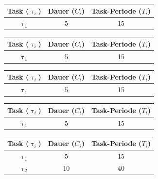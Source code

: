 \begin{frame}{\subsecname}
	\begin{center}
		\begin{tabular}{c||c|c}
			Task ($\uptau_i$) & Dauer ($C_i$) & Task-Periode ($T_i$)\\\hline\hline
			$\uptau_1$ & 5 & 15
		\end{tabular}
	\end{center}
	
\end{frame}

\begin{frame}{\subsecname}
	\begin{center}
		\begin{tabular}{c||c|c}
			Task ($\uptau_i$) & Dauer ($C_i$) & Task-Periode ($T_i$)\\\hline\hline
			$\uptau_1$ & 5 & 15
		\end{tabular}
	\end{center}
	
\end{frame}

\begin{frame}{\subsecname}
	\begin{center}
		\begin{tabular}{c||c|c}
			Task ($\uptau_i$) & Dauer ($C_i$) & Task-Periode ($T_i$)\\\hline\hline
			$\uptau_1$ & 5 & 15
		\end{tabular}
	\end{center}
	
\end{frame}

\begin{frame}{\subsecname}
	\begin{center}
		\begin{tabular}{c||c|c}
			Task ($\uptau_i$) & Dauer ($C_i$) & Task-Periode ($T_i$)\\\hline\hline
			$\uptau_1$ & 5 & 15
		\end{tabular}
	\end{center}
	
\end{frame}

\begin{frame}{\subsecname}
	\begin{center}
		\begin{tabular}{c||c|c}
				Task ($\uptau_i$) & Dauer ($C_i$) & Task-Periode ($T_i$)\\\hline\hline
				$\uptau_1$ & 5 & 15\\
				$\uptau_2$ & 10 & 40\\
		\end{tabular}
	\end{center}	
	
\end{frame}


